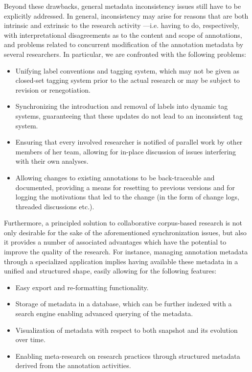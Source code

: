 \documentclass{sig-alternate}
\begin{document}
Beyond these drawbacks, general metadata inconsistency issues still have to be explicitly addressed.
In general, inconsistency may arise for reasons that are both intrinsic and extrinsic to the
research activity ---i.e. having to do, respectively, with interpretational disagreements
as to the content and scope of annotations, and problems related to concurrent modification of
the annotation metadata by several researchers. In particular, we are confronted with the
following problems:
\begin{itemize}
\item Unifying label conventions and tagging system, which may not be given as closed-set
  tagging system prior to the actual research or may be subject to revision or renegotiation.
\item Synchronizing the introduction and removal of labels into dynamic tag systems,
  guaranteeing that these updates do not lead to an inconsistent tag system.
\item Ensuring that every involved researcher is notified of parallel work by other members
  of her team, allowing for in-place discussion of issues interfering with their own analyses.
\item Allowing changes to existing annotations to be back-traceable and documented, providing
  a means for resetting to previous versions and for logging the motivations
  that led to the change (in the form of change logs, threaded discussions etc.).
\end{itemize}

Furthermore, a principled solution to collaborative corpus-based research is not only
desirable for the sake of the aforementioned synchronization issues, but also it provides
a number of associated advantages which have the potential to improve the quality of the research.
For instance, managing annotation metadata through a specialized application implies
having available these metadata in a unified and structured shape, easily allowing
for the following features:

\begin{itemize}
\item Easy export and re-formatting functionality.
\item Storage of metadata in a database, which can be further indexed with a search engine
  enabling advanced querying of the metadata.
\item Visualization of metadata with respect to both snapshot and its evolution over time.
\item Enabling meta-research on research practices through structured metadata derived
  from the annotation activities.
\end{itemize}
\end{document}
